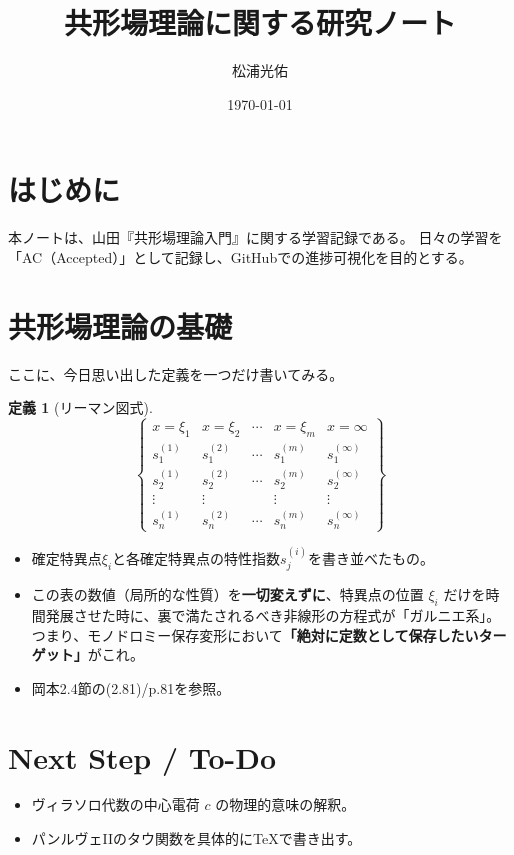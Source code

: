 \documentclass[paper=a4, fontsize=11pt]{jlreq} %
\title{共形場理論に関する研究ノート}
\author{松浦光佑}
\date{\today}
\theoremstyle{definition}
\newtheorem{definition}[theorem]{定義}
\begin{document}
\maketitle
\tableofcontents %

\section{はじめに}
本ノートは、山田『共形場理論入門』に関する学習記録である。
日々の学習を「AC（Accepted）」として記録し、GitHubでの進捗可視化を目的とする。

\section{共形場理論の基礎}
ここに、今日思い出した定義を一つだけ書いてみる。
\begin{definition}[リーマン図式]
    \[
    \left\{
    \begin{matrix}
        x = \xi_1 & x = \xi_2 & \cdots & x = \xi_m & x = \infty \\
        s_1^{(1)} & s_1^{(2)} & \cdots & s_1^{(m)} & s_1^{(\infty)} \\
        s_2^{(1)} & s_2^{(2)} & \cdots & s_2^{(m)} & s_2^{(\infty)} \\
        \vdots    & \vdots    &        & \vdots    & \vdots \\
        s_n^{(1)} & s_n^{(2)} & \cdots & s_n^{(m)} & s_n^{(\infty)}
    \end{matrix}
    \right\}
    \]
    \begin{itemize}
        \item[\textbf{Type:}] 確定特異点$\xi_{i}$と各確定特異点の特性指数$s_j^{(i)}$を書き並べたもの。
        \item[\textbf{Insight:}] この表の数値（局所的な性質）を\textbf{一切変えずに}、特異点の位置 $\xi_i$ だけを時間発展させた時に、裏で満たされるべき非線形の方程式が「ガルニエ系」。つまり、モノドロミー保存変形において\textbf{「絶対に定数として保存したいターゲット」}がこれ。
        \item[\textbf{Link:}] 岡本2.4節の(2.81)/p.81を参照。
    \end{itemize}
\end{definition}



\section{Next Step / To-Do}
\begin{itemize}
    \item [ ] ヴィラソロ代数の中心電荷 $c$ の物理的意味の解釈。
    \item [ ] パンルヴェIIのタウ関数を具体的にTeXで書き出す。
\end{itemize}
\end{document}
